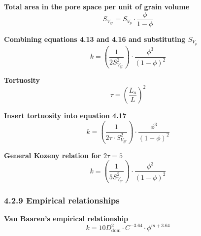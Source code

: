 \textbf{Total area in the pore space per unit of grain volume}
\begin{equation*}
    S_{V_\mathrm{gr}} = S_{V_p}\cdot\frac{\phi}{1 - \phi}\tag{4.16}
\end{equation*}

\textbf{Combining equations 4.13 and 4.16 and substituting $S_{V_p}$}
\begin{equation*}
    k = \left(\frac{1}{2 S_{V_\mathrm{gr}}^2}\right)\cdot\frac{\phi^3}{(1-\phi)^2}\tag{4.17}
\end{equation*}

\textbf{Tortuosity}
\begin{equation*}
    \tau = \left(\frac{L_a}{L}\right)^2\tag{4.18}
\end{equation*}

\textbf{Insert tortuosity into equation 4.17}
\begin{equation*}
    k = \left(\frac{1}{2\tau\cdot S_{V_\mathrm{gr}}^2}\right)\cdot \frac{\phi^3}{(1-\phi)^2}\tag{4.19}
\end{equation*}

\textbf{General Kozeny relation for $2\tau=5$}
\begin{equation*}
    k = \left(\frac{1}{5 S_{V_{gr}}^2}\right)\cdot\frac{\phi^3}{(1 - \phi)^2}\tag{4.20}
\end{equation*}

\subsubsection{4.2.9 Empirical relationships}
\textbf{Van Baaren's empirical relationship}
\begin{equation*}
    k = 10 D_\mathrm{dom}^2\cdot C^{-3.64}\cdot\phi^{m + 3.64}\tag{4.21}
\end{equation*}

